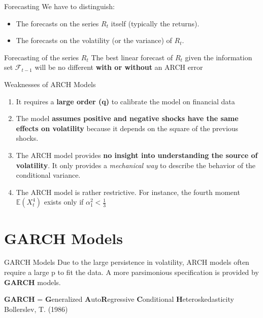 \documentclass{beamer}
\def\Esp{\mathbb{E}}
\def\F{\mathcal{F}}
\newcommand{\imfbold}[1]{\textbf{\textcolor{imfblue}{#1}}}
\begin{document}
\begin{frame}{Forecasting}
\small
We have to distinguish:
\begin{itemize}
    \item The forecasts on the series $R_t$ itself (typically the returns).
    \item The forecasts on the volatility (or the variance) of $R_t$.
\end{itemize}
\begin{alertblock}{Forecasting of the series $R_t$}
    The best linear forecast of $R_t$ given the information set $\F_{t-1}$ will be no different \textbf{with or without} an ARCH error %
\end{alertblock}
\end{frame}
\begin{frame}{Weaknesses of ARCH Models}

\begin{enumerate}
    \item It requires a \textbf{large order (q)} to calibrate the model on financial data 
    \item The model \textbf{assumes positive and negative shocks have the same effects on volatility} because it depends on the square of the previous shocks. 
    
    \item  The ARCH model provides \textbf{no insight into understanding the source of volatility}. It only provides a \emph{mechanical way} to describe the behavior of the conditional variance.
    
    \item The ARCH model is rather restrictive. For instance, the fourth moment $\Esp(X_t^4)$ exists only if $\alpha_1^2< \frac{1}{3}$
\end{enumerate}   
\end{frame}


\section{GARCH Models}
\begin{frame}{GARCH Models}
Due to the large persistence in volatility, ARCH models often require a large p to fit the data. A more parsimonious specification is provided by \imfbold{GARCH} models.
\medskip
\begin{center}
    \textbf{\color{red}GARCH} = \textbf{\color{red}G}eneralized \textbf{\color{red}A}uto\textbf{\color{red}R}egressive \textbf{\color{red}C}onditional \textbf{\color{red}H}eteroskedasticity\\
    Bollerslev, T. (1986)
\end{center}
\end{frame}
\end{document}
